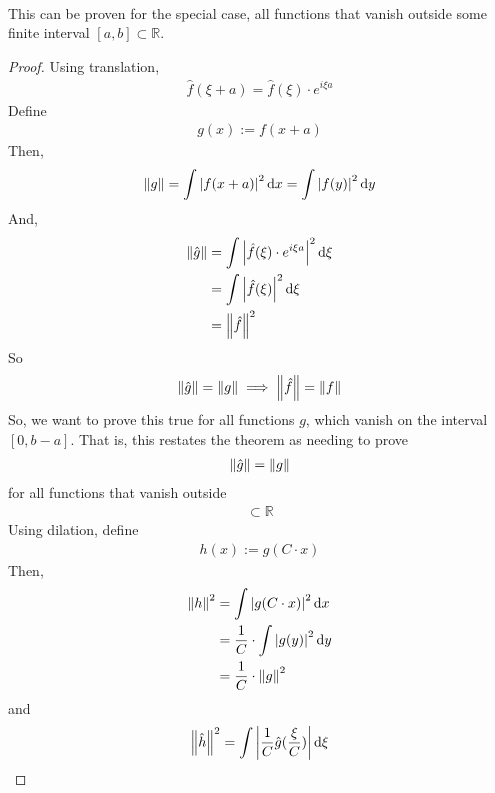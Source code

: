 \begin{enumerate}
\begin{align}
    \end{align}
    This can be proven for the special case, all functions that vanish outside some finite interval $[a, b] \subset \mathbb{R}$.
    \begin{proof}
        Using translation,
        \begin{align}
            \hat{f}(\xi + a) = \hat{f}(\xi) \cdot e^{i\xi a}
        \end{align}
        Define
        \begin{align}
            g(x) := f(x + a)
        \end{align}
        Then, 
        \begin{align}
            \norm{g} = \int \abs{f(x+a)}^2 \dd{x} = \int \abs{f(y)}^2 \dd{y}
        \end{align}
        And,
        \begin{align}
            \norm{\hat{g}} &= \int \abs{\hat{f}(\xi) \cdot e^{i\xi a}}^2 \dd{\xi}\\
            &= \int \abs{\hat{f}(\xi)}^2 \dd{\xi}\\
            &= \norm{\hat{f}}^2
        \end{align}
        So
        \begin{align}
            \norm{\hat{g}} = \norm{g} \implies \norm{\hat{f}} = \norm{f}
        \end{align}
        So, we want to prove this true for all functions $g$, which vanish on the interval $[0, b-a]$. That is, this restates the theorem as needing to prove
        \begin{align}
            \norm{\hat{g}} = \norm{g}
        \end{align}
        for all functions that vanish outside
        \begin{align}
            [0, C] \subset \mathbb{R}
        \end{align}
        Using dilation, define
        \begin{align}
            h(x) := g(C \cdot x)
        \end{align}
        Then,
        \begin{align}
            \norm{h}^2 &= \int \abs{g(C\cdot x)}^2 \dd{x}\\
            &= \dfrac{1}{C} \cdot \int \abs{g(y)}^2 \dd{y}\\
            &= \dfrac{1}{C} \cdot \norm{g}^2
        \end{align}
        and
        \begin{align}
            \norm{\hat{h}}^2 &= \int \abs{\dfrac{1}{C} \hat{g}(\frac{\xi}{C})} \dd{\xi}\\

\end{align}
\end{proof}
\end{enumerate}
